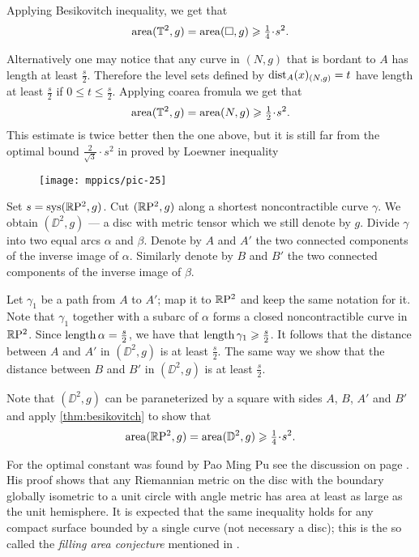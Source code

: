 Applying Besikovitch inequality, we get that 
\[\area(\TT^2,g)=\area(\square,g)\ge \tfrac14\cdot s^2.\]

Alternatively one may notice that any curve in $(N,g)$ that is bordant to $A$ has length at least $\tfrac s2$.
Therefore the level sets defined by $\mathrm{dist}_A(x)_{(N,g)}=t$ have length at least $\tfrac s2$ if $0\le t\le \tfrac s2$.
Applying coarea fromula we get that
\[\area(\TT^2,g)=\area(N,g)\ge \tfrac12\cdot s^2.\]
This estimate is twice better then the one above, but it is still far from the optimal bound $\tfrac2{\sqrt{3}}\cdot s^2$ in proved by Loewner inequality

\begin{wrapfigure}{r}{44 mm}
\vskip-4mm
\centering
\texttt{[image: mppics/pic-25]}
\end{wrapfigure}

Set $s\z=\sys (\RP^2,g)$.
Cut $(\mathbb{R}\mathrm{P}^2,g)$ along a shortest noncontractible curve $\gamma$.
We obtain $(\DD^2,g)$ --- a disc with metric tensor which we still denote by $g$.
Divide $\gamma$ into two equal arcs $\alpha$ and $\beta$.
Denote by $A$ and $A'$ the two connected components of the inverse image of $\alpha$.
Similarly denote by $B$ and $B'$ the two connected components of the inverse image of $\beta$.

Let $\gamma_1$ be a path from $A$ to $A'$;
map it to $\mathbb{R}\mathrm{P}^2$ and keep the same notation for it.
Note that $\gamma_1$ together with a subarc of $\alpha$ forms a closed noncontractible curve in $\mathbb{R}\mathrm{P}^2$.
Since $\mathop{\rm length}\nolimits\alpha=\tfrac s2$, we have that $\mathop{\rm length}\nolimits\gamma_1\geqslant \tfrac s2$.
It follows that the distance between $A$ and $A'$ in $(\DD^2,g)$ is at least $\tfrac s2$.
The same way we show that the distance between $B$ and $B'$ in $(\DD^2,g)$ is at least $\tfrac s2$.

Note that $(\DD^2,g)$ can be paraneterized by a square with sides $A$, $B$, $A'$ and $B'$ and apply \ref{thm:besikovitch} to show that 
\[\area(\RP^2,g)=\area(\DD^2,g)\ge \tfrac14\cdot s^2.\]

For the optimal constant was found by Pao Ming Pu see the discussion on page \pageref{page:pu}.
His proof shows that any Riemannian metric on the disc with the boundary globally isometric to a unit circle with angle metric has area at least as large as the unit hemisphere.
It is expected that the same inequality holds for any compact surface bounded by a single curve (not necessary a disc);
this is the so called the {}\emph{filling area conjecture} mentioned in \cite[5.5.B$'$(e$'$)]{gromov-1983}.

